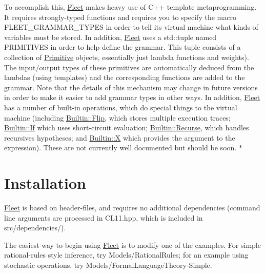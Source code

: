 To accomplish this, \hyperlink{namespace_fleet}{Fleet} makes heavy use of C++ template metaprogramming. It requires strongly-\/typed functions and requires you to specify the macro F\+L\+E\+E\+T\+\_\+\+G\+R\+A\+M\+M\+A\+R\+\_\+\+T\+Y\+P\+ES in order to tell its virtual machine what kinds of variables must be stored. In addition, \hyperlink{namespace_fleet}{Fleet} uses a std\+::tuple named P\+R\+I\+M\+I\+T\+I\+V\+ES in order to help define the grammar. This tuple consists of a collection of \hyperlink{struct_primitive}{Primitive} objects, essentially just lambda functions and weights). The input/output types of these primitives are automatically deduced from the lambdas (using templates) and the corresponding functions are added to the grammar. Note that the details of this mechanism may change in future versions in order to make it easier to add grammar types in other ways. In addition, \hyperlink{namespace_fleet}{Fleet} has a number of built-\/in operations, which do special things to the virtual machine (including \hyperlink{struct_builtin_1_1_flip}{Builtin\+::\+Flip}, which stores multiple execution traces; \hyperlink{struct_builtin_1_1_if}{Builtin\+::\+If} which uses short-\/circuit evaluation; \hyperlink{struct_builtin_1_1_recurse}{Builtin\+::\+Recurse}, which handles recursives hypotheses; and \hyperlink{struct_builtin_1_1_x}{Builtin\+::X} which provides the argument to the expression). These are not currently well documented but should be soon. $\ast$\hypertarget{index_install_sec}{}\section{Installation}\label{index_install_sec}
\hyperlink{namespace_fleet}{Fleet} is based on header-\/files, and requires no additional dependencies (command line arguments are processed in C\+L11.\+hpp, which is included in src/dependencies/).

The easiest way to begin using \hyperlink{namespace_fleet}{Fleet} is to modify one of the examples. For simple rational-\/rules style inference, try Models/\+Rational\+Rules; for an example using stochastic operations, try Models/\+Formal\+Language\+Theory-\/\+Simple.

